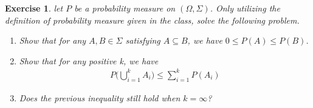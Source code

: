 \documentclass[12pt]{article}
\theoremstyle{colon}
\newtheorem{exercise}{Exercise}
\begin{document}
\clearpage

\begin{exercise}
  let $P$ be a probability measure on $(\Omega, \Sigma)$. Only utilizing the definition of probability measure given in the class, solve the following problem.
  \begin{enumerate}[label=\arabic*)]
    \item Show that for any $A, B \in \Sigma$ satisfying $A \subseteq B$, we have $0 \leq P(A) \leq P(B)$.
    \item Show that for any positive k, we have
      \begin{gather*}
        P \big( \bigcup\limits_{i=1}^k A_i \big) \leq \sum_{i=1}^k P(A_i)
      \end{gather*}
    \item Does the previous inequality still hold when $k = \infty$?
  \end{enumerate}
\end{exercise}
\end{document}
